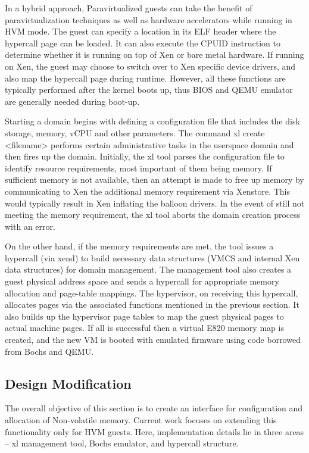 In a hybrid approach, Paravirtualized guests can take the benefit of paravirtualization techniques as well as hardware accelerators while running in HVM mode. The guest can specify a location in its ELF header where the hypercall page can be loaded. It can also execute the CPUID instruction to determine whether it is running on top of Xen or bare metal hardware. If running on Xen, the guest may choose to switch over to Xen specific device drivers, and also map the hypercall page during runtime. However, all these functions are typically performed after the kernel boots up, thus BIOS and QEMU emulator are generally needed during boot-up.

Starting a domain begins with defining a configuration file that includes the disk storage, memory, vCPU and other parameters. The command xl create <filename> performs certain administrative tasks in the userspace domain and then fires up the domain. Initially, the xl tool parses the configuration file to identify resource requirements, most important of them being memory. If sufficient memory is not available, then an attempt is made to free up memory by communicating to Xen the additional memory requirement via Xenstore. This would typically result in Xen inflating the balloon drivers. In the event of still not meeting the memory requirement, the xl tool aborts the domain creation process with an error.

On the other hand, if the memory requirements are met, the tool issues a hypercall (via xend) to build necessary data structures (VMCS and internal Xen data structures) for domain management. The management tool also creates a guest physical address space and sends a hypercall for appropriate memory allocation and page-table mappings. The hypervisor, on receiving this hypercall, allocates pages via the associated functions mentioned in the previous section. It also builds up the hypervisor page tables to map the guest physical pages to actual machine pages. If all is successful then a virtual E820 memory map is created, and the new VM is booted with emulated firmware using code borrowed from Bochs and QEMU.

\subsection{Design Modification}
The overall objective of this section is to create an interface for configuration and allocation of Non-volatile memory. Current work focuses on extending this functionality only for HVM guests. Here, implementation details lie in three areas – xl management tool, Bochs emulator, and hypercall structure.

